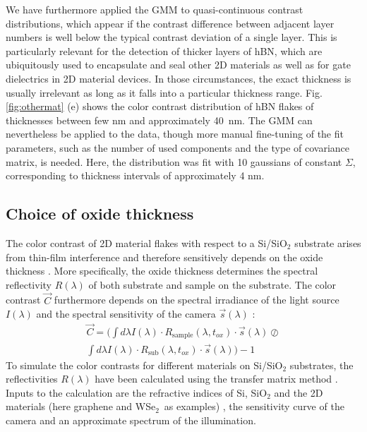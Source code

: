 \documentclass[reprint, prl, superscriptaddress, floatfix]{revtex4-2}
\newcommand{\fig}[1]{Fig.\,\ref{#1}}
\newcommand{\WSe}{WSe$_2$}
\begin{document}
We have furthermore applied the GMM to quasi-continuous contrast distributions, which appear if the contrast difference between adjacent layer numbers is well below the typical contrast deviation of a single layer.  
This is particularly relevant for the detection of thicker layers of hBN, which are ubiquitously used to encapsulate and seal other 2D materials as well as for gate dielectrics in 2D material devices.
In those circumstances, the exact thickness is usually irrelevant as long as it falls into a particular thickness range. 
\fig{fig:othermat} (e) shows the color contrast distribution of hBN flakes of thicknesses between few nm and approximately 40~nm. 
The GMM can nevertheless be applied to the data, though more manual fine-tuning of the fit parameters, such as the number of used components and the type of covariance matrix, is needed.
Here, the distribution was fit with 10 gaussians of constant $\Sigma$, corresponding to thickness intervals of approximately 4 nm. 


\subsection{Choice of oxide thickness}

The color contrast of 2D material flakes with respect to a Si/SiO$_2$ substrate arises from thin-film interference and therefore sensitively depends on the oxide thickness \cite{Gao2008, Li2019Sep}.
More specifically, the oxide thickness determines the spectral reflectivity $R(\lambda)$ of both substrate and sample on the substrate. 
The color contrast  $\vec{C}$ furthermore depends on the spectral irradiance of the light source $I(\lambda)$ and the spectral sensitivity of the camera  $\vec{s}(\lambda)$ \cite{Muller2015}:
\begin{align}
    \vec{C} =  \biggl( \int d\lambda I(\lambda) \cdot R_{\mathrm{sample}}(\lambda, t_{ox}) \cdot \vec{s}(\lambda) \oslash \\ \int d\lambda I(\lambda) \cdot R_{\mathrm{sub}}(\lambda, t_{ox}) \cdot \vec{s}(\lambda)  \biggr) - 1
\end{align}
To simulate the color contrasts for different materials on Si/SiO$_2$ substrates, the reflectivities $R(\lambda)$ have been calculated using the transfer matrix method \cite{Alonso-Alvarez2018}.
Inputs to the calculation are the refractive indices of Si, SiO$_2$ and the 2D materials (here graphene and \WSe\ as examples) \cite{Weber2010, Green1995, Malitson1965, Li2018}, the sensitivity curve of the camera and an approximate spectrum of the illumination.
\end{document}
